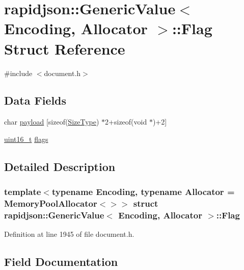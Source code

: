 \hypertarget{structrapidjson_1_1_generic_value_1_1_flag}{}\section{rapidjson\+::Generic\+Value$<$ Encoding, Allocator $>$\+::Flag Struct Reference}
\label{structrapidjson_1_1_generic_value_1_1_flag}


{\ttfamily \#include $<$document.\+h$>$}

\subsection*{Data Fields}
\begin{DoxyCompactItemize}
\item 
char \mbox{\hyperlink{structrapidjson_1_1_generic_value_1_1_flag_a0e32e67950969b58e740e58a8bf75154}{payload}} \mbox{[}sizeof(\mbox{\hyperlink{namespacerapidjson_a44eb33eaa523e36d466b1ced64b85c84}{Size\+Type}}) $\ast$2+sizeof(void $\ast$)+2\mbox{]}
\item 
\mbox{\hyperlink{stdint_8h_a273cf69d639a59973b6019625df33e30}{uint16\+\_\+t}} \mbox{\hyperlink{structrapidjson_1_1_generic_value_1_1_flag_a9183bd992a600cb39c021ff9cda9c7b1}{flags}}
\end{DoxyCompactItemize}


\subsection{Detailed Description}
\subsubsection*{template$<$typename Encoding, typename Allocator = Memory\+Pool\+Allocator$<$$>$$>$\newline
struct rapidjson\+::\+Generic\+Value$<$ Encoding, Allocator $>$\+::\+Flag}



Definition at line 1945 of file document.\+h.



\subsection{Field Documentation}
\mbox{\label{structrapidjson_1_1_generic_value_1_1_flag_a9183bd992a600cb39c021ff9cda9c7b1}} 
